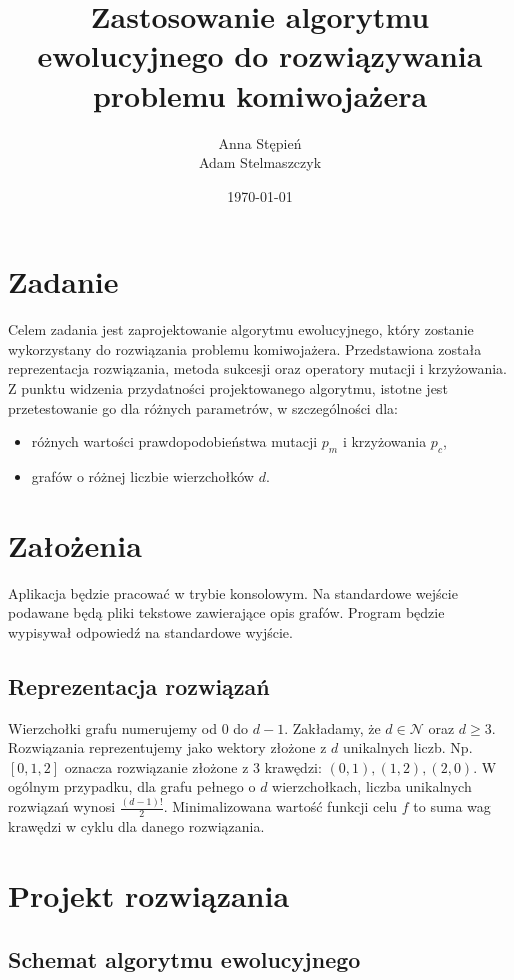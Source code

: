 \documentclass[12pt, a4paper]{article}
\title{\textbf{Zastosowanie algorytmu ewolucyjnego do rozwiązywania problemu komiwojażera}}
\author{Anna Stępień \\ Adam Stelmaszczyk}
\date{\today}
\begin{document}
\maketitle

\section{Zadanie}
Celem zadania jest zaprojektowanie algorytmu ewolucyjnego, który zostanie wykorzystany do rozwiązania problemu komiwojażera.
Przedstawiona została reprezentacja rozwiązania, metoda sukcesji oraz operatory mutacji i krzyżowania. 
Z punktu widzenia przydatności projektowanego algorytmu, istotne jest przetestowanie go dla różnych parametrów, w szczególności dla:
\begin{itemize}
	\item różnych wartości prawdopodobieństwa mutacji $p_m$ i krzyżowania $p_c$,
	\item grafów o różnej liczbie wierzchołków $d$.
\end{itemize}

\section{Założenia}
Aplikacja będzie pracować w trybie konsolowym. Na standardowe wejście podawane będą pliki tekstowe zawierające opis grafów.
Program będzie wypisywał odpowiedź na standardowe wyjście.

\subsection{Reprezentacja rozwiązań}

Wierzchołki grafu numerujemy od 0 do $d - 1$. Zakładamy, że $d \in \mathcal{N}$ oraz $d \geq 3$. 
Rozwiązania reprezentujemy jako wektory złożone z $d$ unikalnych liczb. 
Np. $[0,1,2]$ oznacza rozwiązanie złożone z 3 krawędzi: $(0,1), (1,2), (2,0)$. 
W ogólnym przypadku, dla grafu pełnego o $d$ wierzchołkach, liczba unikalnych rozwiązań wynosi $\frac{(d-1)!}{2}$. 
Minimalizowana wartość funkcji celu $f$ to suma wag krawędzi w cyklu dla danego rozwiązania.

\section{Projekt rozwiązania}

\subsection{Schemat algorytmu ewolucyjnego}
\end{document}
